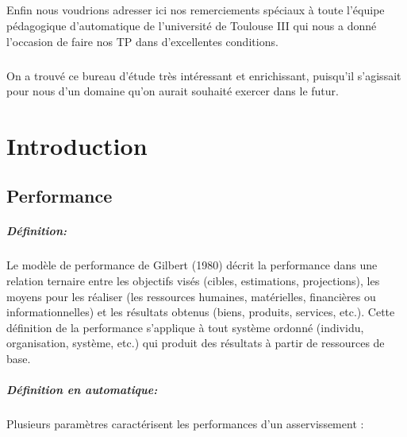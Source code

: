 \documentclass[12pt, a4paper, openany]{report}
\begin{document}
  \paragraph{} 
   Enfin nous voudrions adresser ici nos remerciements spéciaux à toute l’équipe pédagogique d’automatique de l'université de Toulouse III qui nous a donné l’occasion de faire nos TP dans d'excellentes conditions.   \\

  \paragraph{}  
  On a trouvé ce bureau d’étude  très intéressant et enrichissant, puisqu’il s’agissait pour nous d’un domaine qu'on aurait souhaité exercer dans le futur. \\
   
\tableofcontents
\listoffigures



\chapter*{Introduction}
 
 \section*{Performance}
 
 \paragraph{Définition:} Le modèle de performance de Gilbert (1980) décrit la performance dans une relation ternaire entre les objectifs visés (cibles, estimations, projections), les moyens pour les réaliser (les ressources humaines, matérielles, financières ou informationnelles) et les résultats obtenus (biens, produits, services, etc.). Cette définition de la performance s'applique à tout système ordonné (individu, organisation, système, etc.) qui produit des résultats à partir de ressources de base.\cite{ref3}
 
 \paragraph{Définition en automatique:} Plusieurs paramètres caractérisent les performances d'un asservissement :
\end{document}
